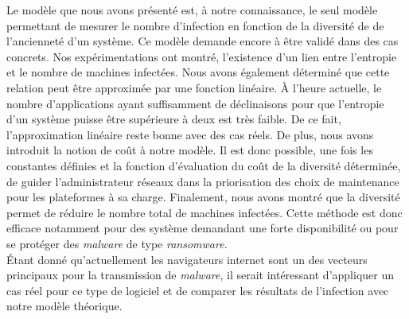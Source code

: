 Le modèle que nous avons présenté est, à notre connaissance, le seul modèle permettant de mesurer le nombre d'infection en fonction de la
diversité de de l'ancienneté d'un système. %
Ce modèle demande encore à être validé dans des cas concrets.
\newline
Nos expérimentations ont montré, l'existence d'un lien entre l'entropie et le nombre de machines infectées.
Nous avons également déterminé que cette relation peut être approximée par une fonction linéaire. 
\`A l'heure actuelle, le nombre d'applications ayant suffisamment de déclinaisons pour que l'entropie d'un système puisse être supérieure à deux est très faible. 
De ce fait, l'approximation linéaire reste bonne avec des cas réels. 
\newline
De plus, nous avons introduit la notion de coût à notre modèle.
Il est donc possible, une fois les constantes définies et la fonction d'évaluation du coût de la diversité déterminée, de guider l'administrateur réseaux dans la priorisation des choix de maintenance pour les plateformes à sa charge.
\newline
Finalement, nous avons montré que la diversité permet de réduire le nombre total de machines infectées.
Cette méthode est donc efficace notamment pour des système demandant une forte disponibilité ou pour se protéger des \textit{malware} de type \textit{ransomware}.
\\
Étant donné qu'actuellement les navigateurs internet sont un des vecteurs principaux pour la transmission de \textit{malware}, il serait intéressant d'appliquer un cas réel pour ce type de logiciel et de comparer les résultats de l'infection avec notre modèle théorique.